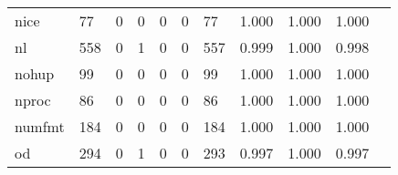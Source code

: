 \begin{longtable}{lp{1.2cm}p{1.2cm}p{1.2cm}p{1.2cm}p{1.2cm}p{1.2cm}p{1.2cm}p{1.2cm}p{1.2cm}p{1.2cm}}
nice      &                                    77 &                                                  0 &                                                  0 &                                                  0 &                                                  0 &                                                 77 &                                         1.000 &                                              1.000 &                                              1.000 \\
nl        &                                   558 &                                                  0 &                                                  1 &                                                  0 &                                                  0 &                                                557 &                                         0.999 &                                              1.000 &                                              0.998 \\
nohup     &                                    99 &                                                  0 &                                                  0 &                                                  0 &                                                  0 &                                                 99 &                                         1.000 &                                              1.000 &                                              1.000 \\
nproc     &                                    86 &                                                  0 &                                                  0 &                                                  0 &                                                  0 &                                                 86 &                                         1.000 &                                              1.000 &                                              1.000 \\
numfmt    &                                   184 &                                                  0 &                                                  0 &                                                  0 &                                                  0 &                                                184 &                                         1.000 &                                              1.000 &                                              1.000 \\
od        &                                   294 &                                                  0 &                                                  1 &                                                  0 &                                                  0 &                                                293 &                                         0.997 &                                              1.000 &                                              0.997 \\

\end{longtable}
